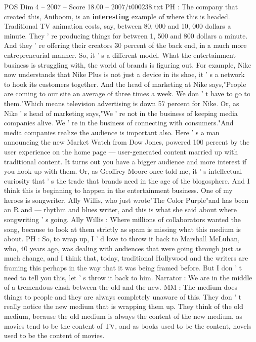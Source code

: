 \begin{textsample}{POS Dim 4 – 2007 – Score 18.00 – 2007/t000238.txt}
PH : The company that created this, Aniboom, is an \textbf{interesting} example of where this is headed.
Traditional TV animation costs, say, between 80, 000 and 10, 000 dollars a minute.
They ' re producing things for between 1, 500 and 800 dollars a minute.
And they ' re offering their creators 30 percent of the back end, in a much more entrepreneurial manner.
So, it ' s a different model.
What the entertainment business is struggling with, the world of brands is figuring out.
For example, Nike now understands that Nike Plus is not just a device in its shoe, it ' s a network to hook its customers together.
And the head of marketing at Nike says,"People are coming to our site an average of three times a week.
We don ' t have to go to them."Which means television advertising is down 57 percent for Nike.
Or, as Nike ' s head of marketing says,"We ' re not in the business of keeping media companies alive.
We ' re in the business of connecting with consumers."And media companies realize the audience is important also.
Here ' s a man announcing the new Market Watch from Dow Jones, powered 100 percent by the user experience on the home page — user-generated content married up with traditional content.
It turns out you have a bigger audience and more interest if you hook up with them.
Or, as Geoffrey Moore once told me, it ' s intellectual curiosity that ' s the trade that brands need in the age of the blogosphere.
And I think this is beginning to happen in the entertainment business.
One of my heroes is songwriter, Ally Willis, who just wrote"The Color Purple"and has been an R and — rhythm and blues writer, and this is what she said about where songwriting ' s going.
Ally Willis : Where millions of collaborators wanted the song, because to look at them strictly as spam is missing what this medium is about.
PH : So, to wrap up, I ' d love to throw it back to Marshall McLuhan, who, 40 years ago, was dealing with audiences that were going through just as much change, and I think that, today, traditional Hollywood and the writers are framing this perhaps in the way that it was being framed before.
But I don ' t need to tell you this, let ' s throw it back to him.
Narrator : We are in the middle of a tremendous clash between the old and the new.
MM : The medium does things to people and they are always completely unaware of this.
They don ' t really notice the new medium that is wrapping them up.
They think of the old medium, because the old medium is always the content of the new medium, as movies tend to be the content of TV, and as books used to be the content, novels used to be the content of movies.

\end{textsample}
